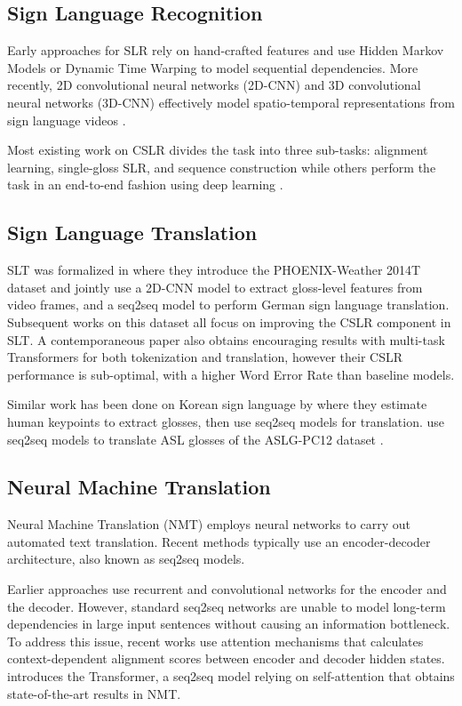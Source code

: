 \documentclass[11pt]{article}
\begin{document}
\subsection{Sign Language Recognition}

Early approaches for SLR rely on hand-crafted features \cite{sift,chinese} and use Hidden Markov Models \cite{hmm1} or Dynamic Time Warping \cite{dtw} to model sequential dependencies. More recently, 2D convolutional neural networks (2D-CNN) and 3D convolutional neural networks (3D-CNN)   effectively model spatio-temporal representations from sign language videos \cite{rcnn,rcnn3d}.

Most existing work on CSLR divides the task into three sub-tasks: alignment learning, single-gloss SLR, and sequence construction \cite{resign,hmmdtw} while others perform the task in an end-to-end fashion using deep learning \cite{3Dcnn,subunet}. 


\subsection{Sign Language Translation}
SLT was formalized in  where they introduce the PHOENIX-Weather 2014T dataset and jointly use a 2D-CNN model to extract gloss-level features from video frames, and a seq2seq model to perform German sign language translation. Subsequent works on this dataset \cite{Orbay2020NeuralSL,stmc} all focus on improving the CSLR component in SLT. A contemporaneous paper \cite{camgoz2020sign} also obtains encouraging results with multi-task Transformers for both tokenization and translation, however their CSLR performance is sub-optimal, with a higher Word Error Rate than baseline models.

Similar work has been done on Korean sign language by  where they estimate human keypoints to extract glosses, then use seq2seq models for translation.  use seq2seq models to translate ASL glosses of the ASLG-PC12 dataset \cite{asl}.


\subsection{Neural Machine Translation}
Neural Machine Translation (NMT) employs neural networks to carry out automated text translation. Recent methods typically use an encoder-decoder architecture, also known as seq2seq models.

Earlier approaches use recurrent \cite{rnn1,rnn2} and convolutional networks \cite{cnn1,cnn2} for the encoder and the decoder. However, standard seq2seq networks are unable to model long-term dependencies in large input sentences without causing an information bottleneck. To address this issue, recent works use attention mechanisms \cite{bahdanau,luong} that calculates context-dependent alignment scores between encoder and decoder hidden states.  introduces the Transformer, a seq2seq model relying on self-attention that obtains state-of-the-art results in NMT. 
\end{document}
